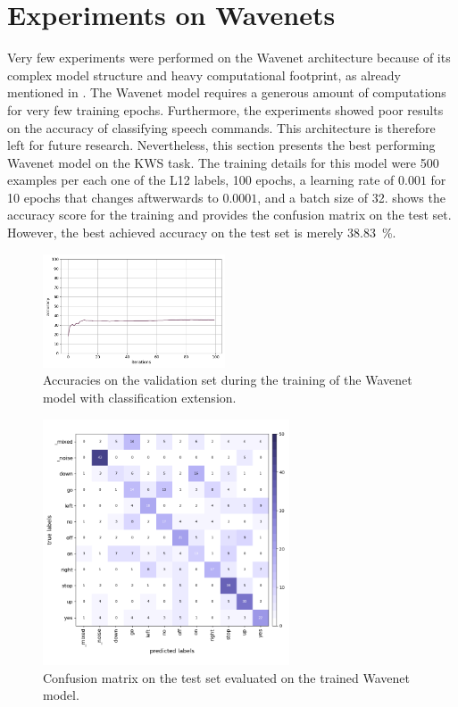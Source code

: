 
\section{Experiments on Wavenets}\label{exp_wavenet}
Very few experiments were performed on the Wavenet architecture because of its complex model structure and heavy computational footprint, as already mentioned in .
The Wavenet model requires a generous amount of computations for very few training epochs.
Furthermore, the experiments showed poor results on the accuracy of classifying speech commands.
This architecture is therefore left for future research.
Nevertheless, this section presents the best performing Wavenet model on the KWS task.
The training details for this model were 500 examples per each one of the L12 labels, 100 epochs, a learning rate of $0.001$ for 10 epochs that changes aftwerwards to $0.0001$, and a batch size of 32.
 shows the accuracy score for the training and  provides the confusion matrix on the test set.
However, the best achieved accuracy on the test set is merely \SI{38.83}{\percent}.
\begin{figure}[!ht]
  \centering
  \includegraphics[width=0.48\textwidth]{./5_exp/figs/exp_wavenet_acc.png}
  \caption{Accuracies on the validation set during the training of the Wavenet model with classification extension.}
  \label{fig:exp_wavenet_acc}
\end{figure}
\begin{figure}[!ht]
  \centering
  \includegraphics[width=0.65\textwidth]{./5_exp/figs/exp_wavenet_confusion_test.png}
  \caption{Confusion matrix on the test set evaluated on the trained Wavenet model.}
  \label{fig:exp_wavenet_confusion}
\end{figure}
\FloatBarrier
\noindent
